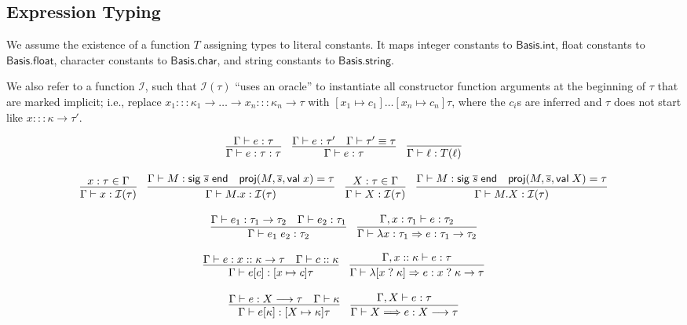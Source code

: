 \documentclass{article}
\newcommand{\mt}[1]{\mathsf{#1}}
\begin{document}
\subsection{Expression Typing}

We assume the existence of a function $T$ assigning types to literal constants.  It maps integer constants to $\mt{Basis}.\mt{int}$, float constants to $\mt{Basis}.\mt{float}$, character constants to $\mt{Basis}.\mt{char}$, and string constants to $\mt{Basis}.\mt{string}$.

We also refer to a function $\mathcal I$, such that $\mathcal I(\tau)$ ``uses an oracle'' to instantiate all constructor function arguments at the beginning of $\tau$ that are marked implicit; i.e., replace $x_1 ::: \kappa_1 \to \ldots \to x_n ::: \kappa_n \to \tau$ with $[x_1 \mapsto c_1]\ldots[x_n \mapsto c_n]\tau$, where the $c_i$s are inferred and $\tau$ does not start like $x ::: \kappa \to \tau'$.

$$\infer{\Gamma \vdash e : \tau : \tau}{
  \Gamma \vdash e : \tau
}
\quad \infer{\Gamma \vdash e : \tau}{
  \Gamma \vdash e : \tau'
  & \Gamma \vdash \tau' \equiv \tau
}
\quad \infer{\Gamma \vdash \ell : T(\ell)}{}$$

$$\infer{\Gamma \vdash x : \mathcal I(\tau)}{
  x : \tau \in \Gamma
}
\quad \infer{\Gamma \vdash M.x : \mathcal I(\tau)}{
  \Gamma \vdash M : \mt{sig} \; \overline{s} \; \mt{end}
  & \mt{proj}(M, \overline{s}, \mt{val} \; x) = \tau
}
\quad \infer{\Gamma \vdash X : \mathcal I(\tau)}{
  X : \tau \in \Gamma
}
\quad \infer{\Gamma \vdash M.X : \mathcal I(\tau)}{
  \Gamma \vdash M : \mt{sig} \; \overline{s} \; \mt{end}
  & \mt{proj}(M, \overline{s}, \mt{val} \; X) = \tau
}$$

$$\infer{\Gamma \vdash e_1 \; e_2 : \tau_2}{
  \Gamma \vdash e_1 : \tau_1 \to \tau_2
  & \Gamma \vdash e_2 : \tau_1
}
\quad \infer{\Gamma \vdash \lambda x : \tau_1 \Rightarrow e : \tau_1 \to \tau_2}{
  \Gamma, x : \tau_1 \vdash e : \tau_2
}$$

$$\infer{\Gamma \vdash e [c] : [x \mapsto c]\tau}{
  \Gamma \vdash e : x :: \kappa \to \tau
  & \Gamma \vdash c :: \kappa
}
\quad \infer{\Gamma \vdash \lambda [x \; ? \; \kappa] \Rightarrow e : x \; ? \; \kappa \to \tau}{
  \Gamma, x :: \kappa \vdash e : \tau
}$$

$$\infer{\Gamma \vdash e [\kappa] : [X \mapsto \kappa]\tau}{
  \Gamma \vdash e : X \longrightarrow \tau
  & \Gamma \vdash \kappa
}
\quad \infer{\Gamma \vdash X \Longrightarrow e : X \longrightarrow \tau}{
  \Gamma, X \vdash e : \tau
}$$
\end{document}
